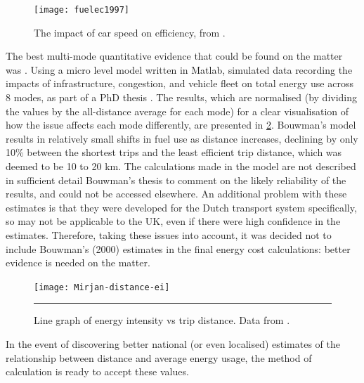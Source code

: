 \begin{figure}[h]
  \centerline{
    \texttt{[image: fuelec1997]}}
  \caption{The impact of car speed on efficiency, from
\citep{Anas2012-price-gas}.}
  \label{f:speeding-car}
\end{figure}

The best multi-mode quantitative evidence that could be found on the matter was
\citep{bouwman2000tracking}. Using a micro level model written in
Matlab, simulated data recording the impacts of infrastructure, congestion,
and vehicle fleet on total energy use across 8 modes, as part of a PhD thesis
\citep{bouwman2000tracking}. The results, which are
normalised (by dividing the values by the all-distance average for each mode)
for a clear visualisation of how the issue affects each
mode differently, are presented in \cref{f:mirjan}. Bouwman's
\citeyear{bouwman2000tracking} model results in relatively small
shifts in fuel use as distance increases, declining by only 10\% between the
shortest trips and the least efficient trip distance, which was deemed to be 10
to 20 km. The calculations made in the model are not described in sufficient
detail Bouwman's thesis to comment on the likely reliability of the results, and
could not be accessed elsewhere. An additional problem with these estimates is
that they were developed for the Dutch transport system specifically, so may
not be applicable to the UK, even if there were high confidence in
the estimates. Therefore, taking these issues into account, it was decided not
to include Bouwman's (2000) estimates in the final
energy cost calculations: better evidence is needed on the matter.

\begin{figure}[h]
  \centerline{
    \texttt{[image: Mirjan-distance-ei]}}
    \rule{35em}{0.5pt}
  \caption[Line graph of energy intensity vs trip distance]
  {Line graph of energy intensity vs trip distance. Data from
\citet{bouwman2000tracking}.}
  \label{f:mirjan}
\end{figure}

In the event of discovering better national (or even localised) estimates of
the relationship between distance and average energy usage, the method of
calculation is ready to accept these values.

